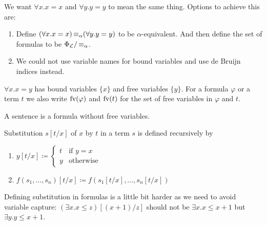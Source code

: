 \begin{rem}
We want $\forall x. x = x$ and $\forall y. y = y$ to mean the same thing. 
Options to achieve this are: 
\begin{enumerate}
    \item Define $(\forall x. x = x) \operatorname{\equiv_{\alpha}} (\forall y. y = y)$ to be \alert{$\alpha$-equivalent}. And then define the set of formulas to be $\Phi_{\mathcal{L}} / \operatorname{\equiv_{\alpha}}$.
    \item We could not use variable names for bound variables and use \alert{de Bruijn indices} instead.
\end{enumerate}
\end{rem}

\begin{rem}
    $\forall x. x = y$ has \alert{bound variables} $\{x\}$ and \alert{free variables} $\{y\}$. For a formula $\varphi$ or a term $t$ we also write \alert{$\text{fv}(\varphi)$} and \alert{$\text{fv}(t)$} for the set of free variables in $\varphi$ and $t$.
\end{rem}

\begin{boxdef}
\begin{defi}
    A \alert{sentence} is a formula without free variables.
\end{defi}
\end{boxdef}

\begin{boxdef}
\begin{defi}
    \alert{Substitution $s[t/x]$} of $x$ by $t$ in a term $s$ is defined recursively by 
    \begin{enumerate}
        \item {$ y[t/x] \coloneq 
                \begin{cases}
                    t & \text{if } y = x \\
                    y & \text{otherwise}
                \end{cases}$}
        \item $f(s_1, \dots, s_n)[t/x] \coloneq f(s_1[t/x], \dots, s_n[t/x])$
    \end{enumerate}
\end{defi}
\end{boxdef}

\begin{example}
    Defining substitution in formulas is a little bit harder as we need to avoid \alert{variable capture}:
    $(\exists x. x \leq z)[(x + 1)/z]$ should not be $\exists x. x \leq x + 1$ but $\exists y. y \leq x + 1$.
\end{example}

